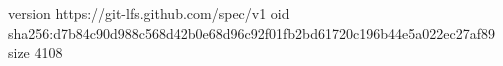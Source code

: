 version https://git-lfs.github.com/spec/v1
oid sha256:d7b84c90d988c568d42b0e68d96c92f01fb2bd61720c196b44e5a022ec27af89
size 4108

